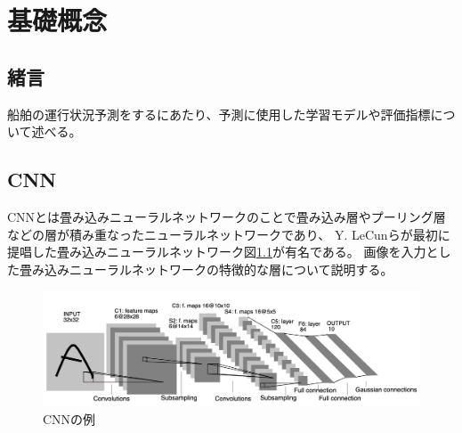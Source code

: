 \chapter{基礎概念}
\label{chap:concept}

\section{緒言}
船舶の運行状況予測をするにあたり、予測に使用した学習モデルや評価指標について述べる。

\section{CNN}
CNNとは畳み込みニューラルネットワークのことで畳み込み層やプーリング層などの層が積み重なったニューラルネットワークであり、
Y. LeCun\cite{Yann LeCun}らが最初に提唱した畳み込みニューラルネットワーク図\ref{lenet}が有名である。
画像を入力とした畳み込みニューラルネットワークの特徴的な層について説明する。
\begin{figure}[H]
 \centering
 \includegraphics[keepaspectratio, scale=0.5]{fig/chapter2/Lenet-5.png}
 \caption{CNNの例\cite{Yann LeCun}}
 \label{lenet}
\end{figure}
